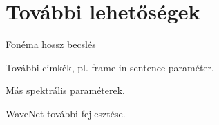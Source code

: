\section{További lehetőségek}
Fonéma hossz becslés

További cimkék, pl. frame in sentence paraméter.

Más spektrális paraméterek.

WaveNet további fejlesztése.
